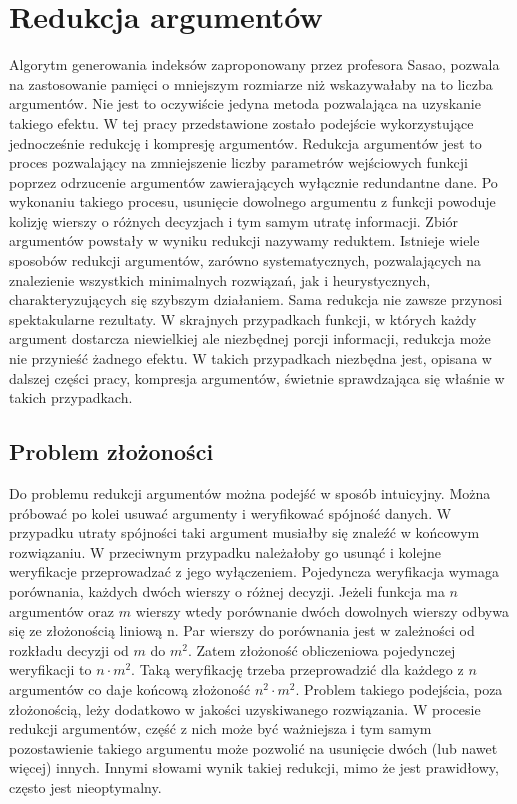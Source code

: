 \chapter{Redukcja argumentów}

Algorytm generowania indeksów zaproponowany przez profesora Sasao, pozwala na zastosowanie pamięci o mniejszym rozmiarze niż wskazywałaby na to liczba argumentów.
Nie jest to oczywiście jedyna metoda pozwalająca na  uzyskanie takiego efektu.
W tej pracy przedstawione zostało podejście wykorzystujące jednocześnie redukcję i kompresję argumentów.
Redukcja argumentów jest to proces pozwalający na zmniejszenie liczby parametrów wejściowych funkcji poprzez odrzucenie argumentów zawierających wyłącznie redundantne dane.
Po wykonaniu takiego procesu, usunięcie dowolnego argumentu z funkcji powoduje kolizję wierszy o różnych decyzjach i tym samym utratę informacji.
Zbiór argumentów powstały w wyniku redukcji nazywamy reduktem.
Istnieje wiele sposobów redukcji argumentów, zarówno systematycznych, pozwalających na znalezienie wszystkich minimalnych rozwiązań, jak i heurystycznych, charakteryzujących się szybszym działaniem.
Sama redukcja nie zawsze przynosi spektakularne rezultaty.
W skrajnych przypadkach funkcji, w których każdy argument dostarcza niewielkiej ale niezbędnej porcji informacji, redukcja może nie przynieść żadnego efektu.
W takich przypadkach niezbędna jest, opisana w dalszej części pracy, kompresja argumentów, świetnie sprawdzająca się właśnie w takich przypadkach.

\section{Problem złożoności}

Do problemu redukcji argumentów można podejść w sposób intuicyjny.
Można próbować po kolei usuwać argumenty i weryfikować spójność danych.
W przypadku utraty spójności taki argument musiałby się znaleźć w końcowym rozwiązaniu.
W przeciwnym przypadku należałoby go usunąć i kolejne weryfikacje przeprowadzać z jego wyłączeniem.
Pojedyncza weryfikacja wymaga porównania, każdych dwóch wierszy o różnej decyzji.
Jeżeli funkcja ma $n$ argumentów oraz $m$ wierszy wtedy porównanie dwóch dowolnych wierszy odbywa się ze złożonością liniową n.
Par wierszy do porównania jest w zależności od rozkładu decyzji od $m$ do $m^2$.
Zatem złożoność obliczeniowa pojedynczej weryfikacji to $n \cdot m^2$.
Taką weryfikację trzeba przeprowadzić dla każdego z $n$ argumentów co daje końcową złożoność $n^2 \cdot m^2$.
Problem takiego podejścia, poza złożonością, leży dodatkowo w jakości uzyskiwanego rozwiązania.
W procesie redukcji argumentów, część z nich może być ważniejsza i tym samym pozostawienie takiego argumentu może pozwolić na usunięcie dwóch (lub nawet więcej) innych.
Innymi słowami wynik takiej redukcji, mimo że jest prawidłowy, często jest nieoptymalny.

